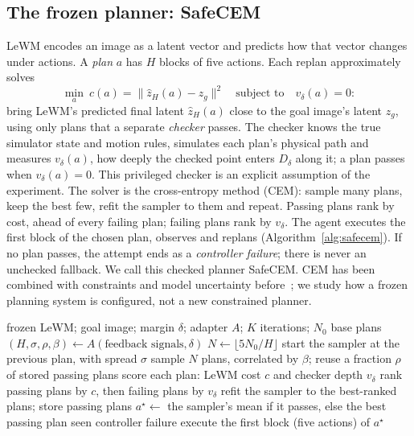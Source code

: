 \documentclass[sigconf,nonacm]{acmart}
\begin{document}
\subsection{The frozen planner: SafeCEM}\label{sec:planner}
LeWM encodes an image as a latent vector and predicts how that vector
changes under actions. A \emph{plan} $a$ has $H$ blocks of five actions.
Each replan approximately solves
\begin{equation}\label{eq:plan}
\min_a\ c(a)=\lVert\hat z_H(a)-z_g\rVert^2\quad\text{subject to}\quad v_\delta(a)=0 :
\end{equation}
bring LeWM's predicted final latent $\hat z_H(a)$ close to the goal image's
latent $z_g$, using only plans that a separate \emph{checker} passes. The
checker knows the true simulator state and motion rules, simulates each
plan's physical path and measures $v_\delta(a)$, how deeply the checked
point enters $D_\delta$ along it; a plan passes when $v_\delta(a)=0$. This
privileged checker is an explicit assumption of the experiment. The solver
is the cross-entropy method (CEM): sample many plans, keep the best few,
refit the sampler to them and repeat. Passing plans rank by cost, ahead of
every failing plan; failing plans rank by $v_\delta$. The agent executes the
first block of the chosen plan, observes and replans
(Algorithm~\ref{alg:safecem}). If no plan passes, the attempt ends as a
\emph{controller failure}; there is never an unchecked fallback. We call
this checked planner SafeCEM. CEM has been combined with constraints and
model uncertainty before~\cite{liu2020cem}; we study how a frozen planning
system is configured, not a new constrained planner.

\begin{algorithm}[t]
\caption{SafeCEM with a planning adapter (one attempt)}
\label{alg:safecem}
\small
\begin{algorithmic}[1]
\Require frozen LeWM; goal image; margin $\delta$; adapter $A$; $K$
iterations; $N_0$ base plans
  \State $(H,\sigma,\rho,\beta)\gets A(\text{feedback signals},\delta)$ 
  \State $N\gets\lfloor5N_0/H\rfloor$ 
  \State start the sampler at the previous plan, with spread $\sigma$
    \State sample $N$ plans, correlated by $\beta$; reuse a fraction $\rho$
    of stored passing plans
    \State score each plan: LeWM cost $c$ and checker depth $v_\delta$
    \State rank passing plans by $c$, then failing plans by $v_\delta$
    \State refit the sampler to the best-ranked plans; store passing plans
  \EndFor
  \State $a^\star\gets$ the sampler's mean if it passes, else the best
  passing plan seen
   \Return controller failure
  \EndIf
  \State execute the first block (five actions) of $a^\star$
\EndWhile
\end{algorithmic}
\end{algorithm}
\end{document}
